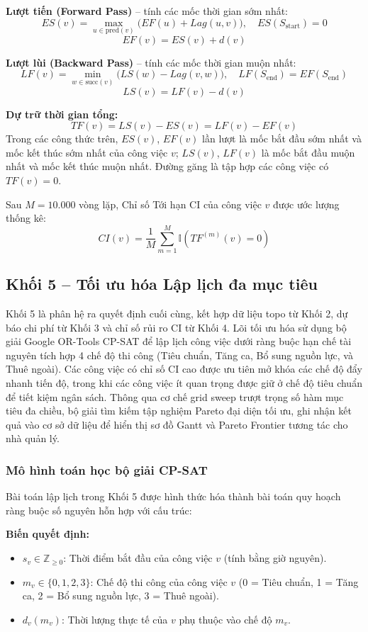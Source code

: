 \textbf{Lượt tiến (Forward Pass)} -- tính các mốc thời gian sớm nhất:
$$ES(v) = \max_{u \in \mathrm{pred}(v)} \bigl( EF(u) + Lag(u, v) \bigr), \quad ES(S_{\mathrm{start}}) = 0$$
$$EF(v) = ES(v) + d(v)$$

\textbf{Lượt lùi (Backward Pass)} -- tính các mốc thời gian muộn nhất:
$$LF(v) = \min_{w \in \mathrm{succ}(v)} \bigl( LS(w) - Lag(v, w) \bigr), \quad LF(S_{\mathrm{end}}) = EF(S_{\mathrm{end}})$$
$$LS(v) = LF(v) - d(v)$$

\textbf{Dự trữ thời gian tổng:}
$$TF(v) = LS(v) - ES(v) = LF(v) - EF(v)$$
Trong các công thức trên, $ES(v)$, $EF(v)$ lần lượt là mốc bắt đầu sớm nhất và mốc kết thúc sớm nhất của công việc $v$; $LS(v)$, $LF(v)$ là mốc bắt đầu muộn nhất và mốc kết thúc muộn nhất. Đường găng là tập hợp các công việc có $TF(v) = 0$.

Sau $M = 10.000$ vòng lặp, Chỉ số Tới hạn CI của công việc $v$ được ước lượng thống kê:
$$CI(v) = \frac{1}{M} \sum_{m=1}^{M} \mathbb{I}\!\left( TF^{(m)}(v) = 0 \right)$$

\subsection{Khối 5 -- Tối ưu hóa Lập lịch đa mục tiêu}
Khối 5 là phân hệ ra quyết định cuối cùng, kết hợp dữ liệu topo từ Khối 2, dự báo chi phí từ Khối 3 và chỉ số rủi ro CI từ Khối 4. Lõi tối ưu hóa sử dụng bộ giải Google OR-Tools CP-SAT để lập lịch công việc dưới ràng buộc hạn chế tài nguyên tích hợp 4 chế độ thi công (Tiêu chuẩn, Tăng ca, Bổ sung nguồn lực, và Thuê ngoài). Các công việc có chỉ số CI cao được ưu tiên mở khóa các chế độ đẩy nhanh tiến độ, trong khi các công việc ít quan trọng được giữ ở chế độ tiêu chuẩn để tiết kiệm ngân sách. Thông qua cơ chế grid sweep trượt trọng số hàm mục tiêu đa chiều, bộ giải tìm kiếm tập nghiệm Pareto đại diện tối ưu, ghi nhận kết quả vào cơ sở dữ liệu để hiển thị sơ đồ Gantt và Pareto Frontier tương tác cho nhà quản lý.

\subsubsection{Mô hình toán học bộ giải CP-SAT}
Bài toán lập lịch trong Khối 5 được hình thức hóa thành bài toán quy hoạch ràng buộc số nguyên hỗn hợp với cấu trúc:

\textbf{Biến quyết định:}
\begin{itemize}
    \item $s_v \in \mathbb{Z}_{\geq 0}$: Thời điểm bắt đầu của công việc $v$ (tính bằng giờ nguyên).
    \item $m_v \in \{0, 1, 2, 3\}$: Chế độ thi công của công việc $v$ (0 = Tiêu chuẩn, 1 = Tăng ca, 2 = Bổ sung nguồn lực, 3 = Thuê ngoài).
    \item $d_v(m_v)$: Thời lượng thực tế của $v$ phụ thuộc vào chế độ $m_v$.
\end{itemize}

